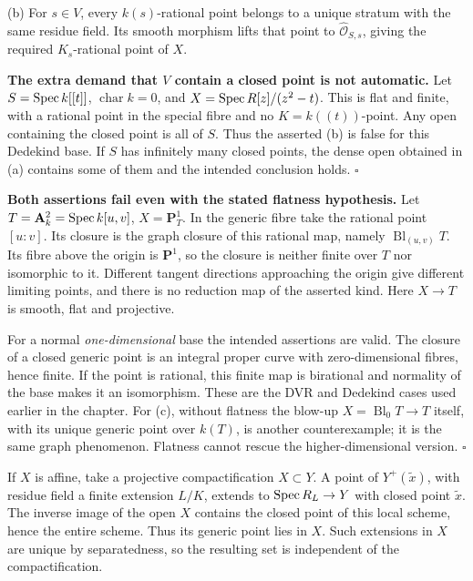 \documentclass[11pt]{article}
\let\chapterexercise\exercise
\renewcommand{\exercise}[2]{\Needspace{8\baselineskip}\chapterexercise{#1}{#2}}
\begin{document}
(b) For $s\in V$, every $k(s)$-rational point belongs to a unique stratum with the same residue field. Its smooth morphism lifts that point to $\widehat{\mathcal O}_{S,s}$, giving the required $K_s$-rational point of $X$.

\textbf{The extra demand that $V$ contain a closed point is not automatic.} Let $S=\operatorname{Spec} k[[t]]$, $\operatorname{char}k=0$, and $X=\operatorname{Spec} R[z]/(z^2-t)$. This is flat and finite, with a rational point in the special fibre and no $K=k((t))$-point. Any open containing the closed point is all of $S$. Thus the asserted (b) is false for this Dedekind base. If $S$ has infinitely many closed points, the dense open obtained in (a) contains some of them and the intended conclusion holds. \hfill$\square$

\pf \textbf{Both assertions fail even with the stated flatness hypothesis.} Let $T=\mathbf A^2_k=\operatorname{Spec} k[u,v]$, $X=\mathbf P^1_T$. In the generic fibre take the rational point $[u:v]$. Its closure is the graph closure of this rational map, namely $\operatorname{Bl}_{(u,v)}T$. Its fibre above the origin is $\mathbf P^1$, so the closure is neither finite over $T$ nor isomorphic to it. Different tangent directions approaching the origin give different limiting points, and there is no reduction map of the asserted kind. Here $X\to T$ is smooth, flat and projective.

For a normal \emph{one-dimensional} base the intended assertions are valid. The closure of a closed generic point is an integral proper curve with zero-dimensional fibres, hence finite. If the point is rational, this finite map is birational and normality of the base makes it an isomorphism. These are the DVR and Dedekind cases used earlier in the chapter. For (c), without flatness the blow-up $X=\operatorname{Bl}_0T\to T$ itself, with its unique generic point over $k(T)$, is another counterexample; it is the same graph phenomenon. Flatness cannot rescue the higher-dimensional version. \hfill$\square$

\pf If $X$ is affine, take a projective compactification $X\subset Y$. A point of $Y^+(\widetilde x)$, with residue field a finite extension $L/K$, extends to $\operatorname{Spec} R_L\to Y$ with closed point $\widetilde x$. The inverse image of the open $X$ contains the closed point of this local scheme, hence the entire scheme. Thus its generic point lies in $X$. Such extensions in $X$ are unique by separatedness, so the resulting set is independent of the compactification.
\end{document}
